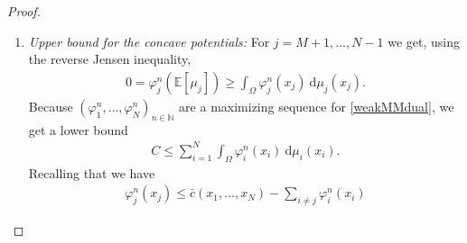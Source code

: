 \documentclass[letterpaper]{amsart}
\newcommand{\RR}{\mathbb{R}}
\newcommand{\NN}{\mathbb{N}}
\newcommand{\EE}{\mathbb{E}}
\newcommand{\dd}{\mathrm{d}}
\theoremstyle{definition}
\begin{document}
\begin{proof}
\begin{enumerate}
\begin{align*}
		\varphi_j^n(x_j)&\geq-\big(\lambda_j|\cdot|^p\big)^*(0)-\Big(\sum_{i\ne j}\inf_{x_i\in\Omega}\lambda_i|x_i-\cdot|^p-\varphi_i^n(x_i)\Big)^*(0)\\
		&=-\sup_{v_1\in\Omega}-\lambda_j|v_1|^p-\sup_{v_2\in\Omega}-\sum_{i\neq j}\inf_{x_i\in\Omega}\lambda_i|x_i-v_2|^p-\varphi_i^n(x_i)\\
		&=\inf_{v_1\in\Omega}\lambda_j|v_1|^p+\inf_{v_2\in\Omega}\sum_{i\neq j}\inf_{x_i\in\Omega}\lambda_i|x_i-v_2|^p-\varphi_i^n(x_i)\\
		&=\inf_{v_2\in\Omega}\sum_{i\neq j}\inf_{x_i\in\Omega}\lambda_i|x_i-v_2|^p-\varphi_i^n(x_i)=:C_1(n)
	\end{align*}
	and we also get
	\begin{align*}
		\varphi_j^n(x_j)&\leq\inf_{z\in\Omega}\lambda_j|x_j-z|^p+\sum_{i\neq j}\inf_{x_i\in\Omega}\lambda_i|x_i-z|^p-\varphi_i^n(x_i)\\
		&\leq \inf_{z\in\Omega}\lambda_j\text{diam}(\Omega)^p+\sum_{i\neq j}\inf_{x_i\in\Omega}\lambda_i|x_i-z|^p-\varphi_i^n(x_i)=:C+C_1(n)
	\end{align*}
	for some $C>0$ and we notice that $C_1(n)\in[-\infty,+\infty]$ does not depend on $x_j$ anymore.
	Because of $0=\varphi_j^n(\EE[\mu_j])$ we get
	\begin{gather*}
		C_1(n)\leq 0\leq C+C_1(n).
	\end{gather*}
	which shows equivalently that
	\begin{gather*}
		-C\leq C_1(n)\leq 0
	\end{gather*}
	and that therefore $-C\leq\varphi_j^n(x_j)\leq C$ with $C\in\RR$ independent of $n$ and $x_j$ (and it shows that replacing $\varphi_j^n$ by the bi-conjugate preserves continuity).
	\item \textit{Upper bound for the concave potentials:}
	For $j=M+1,\dots,N-1$ we get, using the reverse Jensen inequality,
	\begin{gather}\label{integralbound}
		0=\varphi_j^n(\EE[\mu_j])\geq\int_{\Omega}\varphi_j^n(x_j)\ \dd\mu_j(x_j).
	\end{gather}
	Because $(\varphi_1^n,\dots,\varphi_N^n)_{n\in\NN}$ are a maximizing sequence for \eqref{weakMMdual}, we get a lower bound
	\begin{gather}\label{lowerboundmaximization}
		C\leq\sum_{i=1}^N\int_{\Omega}\varphi_i^n(x_i)\ \dd\mu_i(x_i).
	\end{gather}
	Recalling that we have
	\begin{gather*}
		\varphi_j^n(x_j)\leq\bar c(x_1,\dots,x_N)-\sum_{i\neq j}\varphi_i^n(x_i)

\end{gather*}
\end{enumerate}
\end{proof}
\end{document}
